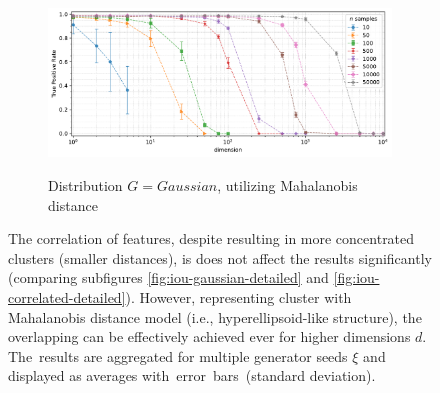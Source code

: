 \begin{figure}[t]
    \vspace{-0.75em}
    \begin{subfigure}[b]{0.9\textwidth}
        \centering
        \caption{\small Distribution $G = Gaussian$, utilizing Mahalanobis distance}
        \includegraphics[width=\textwidth]{images/overlapping/trend-distributions-sens_99(dimension)-distance_8-distribution_gaussian-model_MD-samples_10,50,100,500,1000,5000,10000,50000-aggregated.pdf}
        \label{fig:tpr-gaussian-md}
    \end{subfigure}

    \vspace{-0.5em}
    \caption{The correlation of features, despite resulting in more concentrated clusters (smaller distances), is does not affect the results significantly (comparing subfigures \ref{fig:iou-gaussian-detailed} and \ref{fig:iou-correlated-detailed}). However, representing cluster with Mahalanobis distance model (i.e., hyperellipsoid-like structure), the overlapping can be effectively achieved ever for higher dimensions $d$. The~results are aggregated for multiple generator seeds $\xi$ and displayed as averages with~error~bars~(standard deviation).}
    \label{fig:overlapping-2}
    \vspace{-3.2em}
\end{figure}

